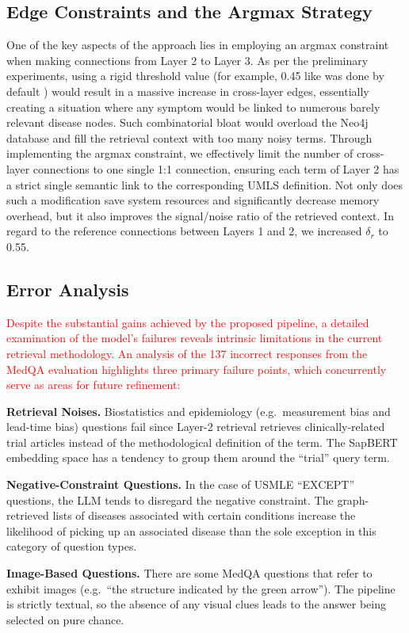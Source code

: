 \documentclass[a4paper,fleqn]{cas-sc}
\begin{document}
\subsection{Edge Constraints and the Argmax Strategy}
One of the key aspects of the approach lies in employing an argmax constraint when making connections from Layer 2 to Layer 3. As per the preliminary experiments, using a rigid threshold value (for example, 0.45 like was done by default \cite{wu2024medgraphrag}) would result in a massive increase in cross-layer edges, essentially creating a situation where any symptom would be linked to numerous barely relevant disease nodes. Such combinatorial bloat would overload the Neo4j database and fill the retrieval context with too many noisy terms. Through implementing the argmax constraint, we effectively limit the number of cross-layer connections to one single 1:1 connection, ensuring each term of Layer 2 has a strict single semantic link to the corresponding UMLS definition. Not only does such a modification save system resources and significantly decrease memory overhead, but it also improves the signal/noise ratio of the retrieved context. In regard to the reference connections between Layers 1 and 2, we increased $\delta_r$ to 0.55.
\subsection{Error Analysis}
\textcolor{red}{Despite the substantial gains achieved by the proposed pipeline, a detailed examination of the model's failures reveals intrinsic limitations in the current retrieval methodology. An analysis of the 137 incorrect responses from the MedQA evaluation highlights three primary failure points, which concurrently serve as areas for future refinement:}

\textbf{Retrieval Noises.} Biostatistics and epidemiology (e.g.\ measurement bias and lead-time bias) questions fail since Layer-2 retrieval retrieves clinically-related trial articles instead of the methodological definition of the term. The SapBERT embedding space has a tendency to group them around the ``trial'' query term.

\textbf{Negative-Constraint Questions.} In the case of USMLE ``EXCEPT'' questions, the LLM tends to disregard the negative constraint. The graph-retrieved lists of diseases associated with certain conditions increase the likelihood of picking up an associated disease than the sole exception in this category of question types.

\textbf{Image-Based Questions.} There are some MedQA questions that refer to exhibit images (e.g.\ ``the structure indicated by the green arrow''). The pipeline is strictly textual, so the absence of any visual clues leads to the answer being selected on pure chance.
\end{document}
